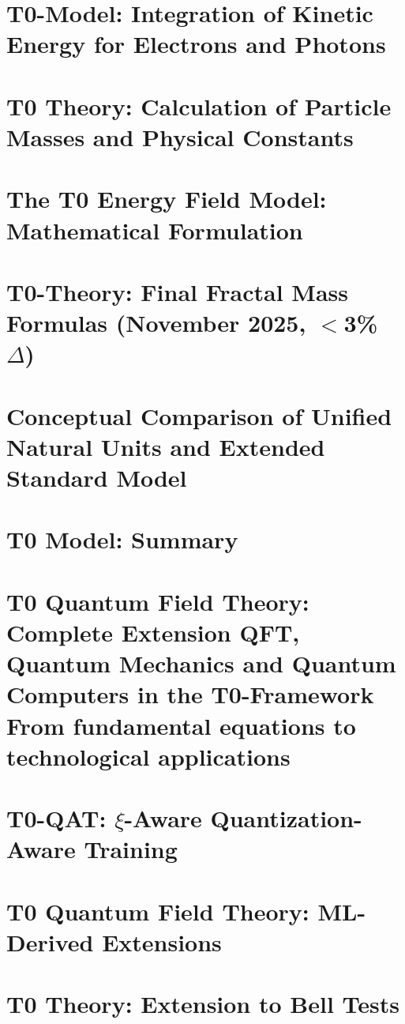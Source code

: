 	\chapter{T0-Model: Integration of Kinetic Energy for Electrons and Photons}
	
	\chapter{T0 Theory: Calculation of Particle Masses and Physical Constants}
	
	\chapter{The T0 Energy Field Model: Mathematical Formulation}
	
	\chapter{T0-Theory: Final Fractal Mass Formulas (November 2025, $<$3\% $\Delta$)}
	
	\chapter{Conceptual Comparison of Unified Natural Units and Extended Standard Model}
	
	\chapter{T0 Model: Summary}
	
	\chapter{T0 Quantum Field Theory: Complete Extension QFT, Quantum Mechanics and Quantum Computers in the T0-Framework From fundamental equations to technological applications}
	
	\chapter{T0-QAT: $\xi$-Aware Quantization-Aware Training}
	
	\chapter{T0 Quantum Field Theory: ML-Derived Extensions}
	
	\chapter{T0 Theory: Extension to Bell Tests}
	
